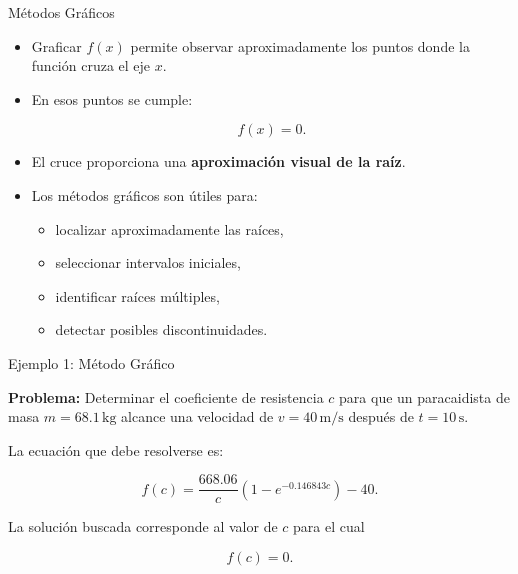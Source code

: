 \documentclass[../../main.tex]{subfiles}
\begin{document}
\begin{frame}{Métodos Gráficos}

\begin{itemize}

    \item Graficar \(f(x)\) permite observar aproximadamente los puntos donde la función cruza el eje \(x\).

    \item En esos puntos se cumple:

    \[
    f(x)=0.
    \]

    \item El cruce proporciona una \textbf{aproximación visual de la raíz}.

    \item Los métodos gráficos son útiles para:

    \begin{itemize}
        \item localizar aproximadamente las raíces,
        \item seleccionar intervalos iniciales,
        \item identificar raíces múltiples,
        \item detectar posibles discontinuidades.
    \end{itemize}

\end{itemize}

\end{frame}



\begin{frame}{Ejemplo 1: Método Gráfico}

\textbf{Problema:}
Determinar el coeficiente de resistencia \(c\) para que un paracaidista de masa
\(
m=68.1\,\text{kg}
\)
alcance una velocidad de
\(
v=40\,\text{m/s}
\)
después de
\(
t=10\,\text{s}.
\)

\vspace{0.3cm}
La ecuación que debe resolverse es:

\[
f(c)=
\frac{668.06}{c}
\left(
1-e^{-0.146843c}
\right)
-40.
\]

La solución buscada corresponde al valor de \(c\) para el cual

\[
f(c)=0.
\]

\end{frame}


\end{document}
